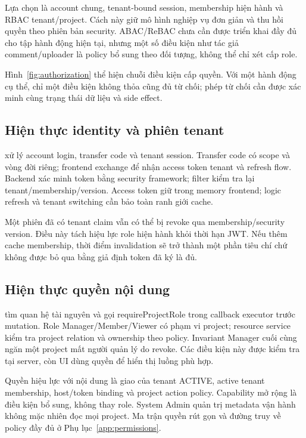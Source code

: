 Lựa chọn là account chung, tenant-bound session, membership hiện hành và RBAC tenant\slash project. Cách này giữ mô hình nghiệp vụ đơn giản và thu hồi quyền theo phiên bản security. ABAC\slash ReBAC chưa cần được triển khai đầy đủ cho tập hành động hiện tại, nhưng một số điều kiện như tác giả comment\slash uploader là policy bổ sung theo đối tượng, không thể chỉ xét cấp role.

Hình~\ref{fig:authorization} thể hiện chuỗi điều kiện cấp quyền. Với một hành động cụ thể, chỉ một điều kiện không thỏa cũng đủ từ chối; phép từ chối cần được xác minh cùng trạng thái dữ liệu và side effect.


\subsection{Hiện thực identity và phiên tenant}
 xử lý account login, transfer code và tenant session. Transfer code có scope và vòng đời riêng; frontend exchange để nhận access token tenant và refresh flow. Backend xác minh token bằng security framework; filter kiểm tra lại tenant\slash membership\slash version. Access token giữ trong memory frontend; logic refresh và tenant switching cần bảo toàn ranh giới cache.

Một phiên đã có tenant claim vẫn có thể bị revoke qua membership\slash security version. Điều này tách hiệu lực role hiện hành khỏi thời hạn JWT. Nếu thêm cache membership, thời điểm invalidation sẽ trở thành một phần tiêu chí chứ không được bỏ qua bằng giả định token đã ký là đủ.

\subsection{Hiện thực quyền nội dung}
 tìm quan hệ tài nguyên và gọi requireProjectRole trong callback executor trước mutation. Role Manager\slash Member\slash Viewer có phạm vi project; resource service kiểm tra project relation và ownership theo policy. Invariant Manager cuối cùng ngăn một project mất người quản lý do revoke. Các điều kiện này được kiểm tra tại server, còn UI dùng quyền để hiển thị luồng phù hợp.

Quyền hiệu lực với nội dung là giao của tenant ACTIVE, active tenant membership, host\slash token binding và project action policy. Capability mở rộng là điều kiện bổ sung, không thay role. System Admin quản trị metadata vận hành không mặc nhiên đọc mọi project. Ma trận quyền rút gọn và đường truy về policy đầy đủ ở Phụ lục~\ref{app:permissions}.


